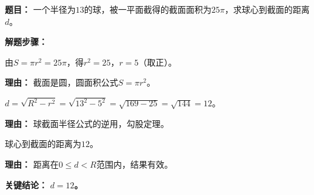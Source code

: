 \begin{examplebox}
	\textbf{\textcolor{CExample}{题目：}}
	一个半径为$13$的球，被一平面截得的截面面积为$25\pi$，求球心到截面的距离$d$。

	\textbf{\textcolor{CExample}{解题步骤：}}
	\begin{description}[style=nextline, leftmargin=2.8em, labelsep=0.5em, itemsep=0.45em]
		\item[\textbf{第一步（由面积求半径）：}] 由$S=\pi r^{2}=25\pi$，得$r^{2}=25$，$r=5$（取正）。
			\par\textbf{理由：} 截面是圆，圆面积公式$S=\pi r^{2}$。
		\item[\textbf{第二步（利用公式求距离）：}] $d=\sqrt{R^{2}-r^{2}}=\sqrt{13^{2}-5^{2}}=\sqrt{169-25}=\sqrt{144}=12$。
			\par\textbf{理由：} 球截面半径公式的逆用，勾股定理。
		\item[\textbf{第三步（得出结论）：}] 球心到截面的距离为$12$。
			\par\textbf{理由：} 距离在$0\le d<R$范围内，结果有效。
	\end{description}

	\textbf{\textcolor{CExample}{关键结论：}}
	\textbf{$d=12$。}
\end{examplebox}
